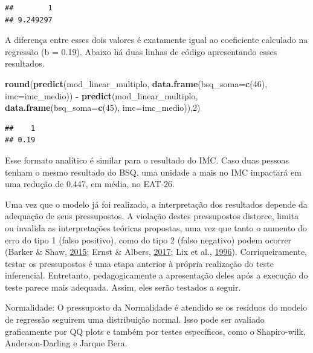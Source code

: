 \documentclass[
]{book}
\newenvironment{Shaded}{\begin{snugshade}}{\end{snugshade}}
\newcommand{\DataTypeTok}[1]{\textcolor[rgb]{0.13,0.29,0.53}{#1}}
\newcommand{\DecValTok}[1]{\textcolor[rgb]{0.00,0.00,0.81}{#1}}
\newcommand{\KeywordTok}[1]{\textcolor[rgb]{0.13,0.29,0.53}{\textbf{#1}}}
\newcommand{\NormalTok}[1]{#1}
\newcommand{\OperatorTok}[1]{\textcolor[rgb]{0.81,0.36,0.00}{\textbf{#1}}}
\newcommand{\StringTok}[1]{\textcolor[rgb]{0.31,0.60,0.02}{#1}}
\begin{document}
\begin{verbatim}
##        1 
## 9.249297
\end{verbatim}

A diferença entre esses dois valores é exatamente igual ao coeficiente
calculado na regressão (b = 0.19). Abaixo há duas linhas de código
apresentando esses resultados.

\begin{Shaded}
\begin{Highlighting}[]
\KeywordTok{round}\NormalTok{(}\KeywordTok{predict}\NormalTok{(mod_linear_multiplo, }\KeywordTok{data.frame}\NormalTok{(}\DataTypeTok{bsq_soma=}\KeywordTok{c}\NormalTok{(}\DecValTok{46}\NormalTok{), }\DataTypeTok{imc=}\NormalTok{imc_medio)) }\OperatorTok{-}\StringTok{ }\KeywordTok{predict}\NormalTok{(mod_linear_multiplo, }\KeywordTok{data.frame}\NormalTok{(}\DataTypeTok{bsq_soma=}\KeywordTok{c}\NormalTok{(}\DecValTok{45}\NormalTok{), }\DataTypeTok{imc=}\NormalTok{imc_medio)),}\DecValTok{2}\NormalTok{)}
\end{Highlighting}
\end{Shaded}

\begin{verbatim}
##    1 
## 0.19
\end{verbatim}

Esse formato analítico é similar para o resultado do IMC. Caso duas
pessoas tenham o mesmo resultado do BSQ, uma unidade a mais no IMC
impactará em uma redução de 0.447, em média, no EAT-26.

Uma vez que o modelo já foi realizado, a interpretação dos resultados
depende da adequação de seus pressupostos. A violação destes
pressupostos distorce, limita ou invalida as interpretações teóricas
propostas, uma vez que tanto o aumento do erro do tipo 1 (falso
positivo), como do tipo 2 (falso negativo) podem ocorrer (Barker \&
Shaw, \protect\hyperlink{ref-Barker2015}{2015}; Ernst \& Albers,
\protect\hyperlink{ref-Ernst2017}{2017}; Lix et al.,
\protect\hyperlink{ref-Lix1996}{1996}). Corriqueiramente, testar os
pressupostos é uma etapa anterior à própria realização do teste
inferencial. Entretanto, pedagogicamente a apresentação deles após a
execução do teste parece mais adequada. Assim, eles serão testados a
seguir.

Normalidade: O pressuposto da Normalidade é atendido se os resíduos do
modelo de regressão seguirem uma distribuição normal. Isso pode ser
avaliado graficamente por QQ plots e também por testes específicos, como
o Shapiro-wilk, Anderson-Darling e Jarque Bera.
\end{document}
